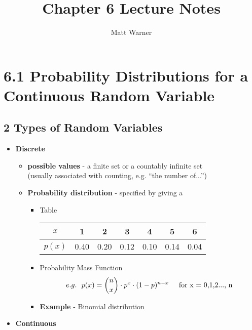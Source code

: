 \documentclass{report}
\title{\Huge{Chapter 6 Lecture Notes  }}
\author{\huge{Matt Warner}}
\date{\huge{}}
\begin{document}
  \maketitle
  \section*{6.1 Probability Distributions for a Continuous Random Variable}
  \bigbreak \noindent
  \subsection*{2 Types of Random Variables}
  \begin{itemize}[label=$\bullet$]
    \item \textbf{Discrete} 
      \begin{itemize}[label=$\circ$]
        \item \textbf{possible values} -  a finite set or a countably infinite set \\ (usually associated with counting, e.g. ``the number of...'')
      \bigbreak \noindent
        \item \textbf{Probability distribution} - specified by giving a
          \begin{itemize}[label=$\circ$]
            \vspace{1em}

          \item Table  
            \vspace{5mm}
            \begin{center}
            \begin{tabular}{c|cccccc}
            $x$ & 1 & 2 & 3 & 4 & 5 & 6 \\
            \hline$p(x)$ & 0.40 & 0.20 & 0.12 & 0.10 & 0.14 & 0.04
            \end{tabular}
            \end{center}
            \bigbreak \noindent
            \vspace{2mm}

            \item Probability Mass Function
              $$ e.g. \ \  p(x) = {n \choose x} \cdot p^x \cdot (1 - p)^{n-x} \hspace{5mm} \text{for x = 0,1,2..., n}$$
            \bigbreak \noindent
          \item \textbf{Example} - Binomial distribution
          \end{itemize}
      \end{itemize}
      \bigbreak \noindent
    \item \textbf{Continuous}
      \begin{itemize}[label=$\circ$]
        \vspace{1em}


\end{itemize}
\end{itemize}
\end{document}
